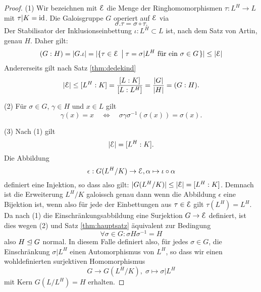 \documentclass{book}
\begin{document}
\begin{proof}
    (1) Wir bezeichnen mit $\EuScript{E}$ die Menge der Ringhomomorphismen $\tau: L^H \to L$
    mit $\tau|K = \operatorname{id}$. Die Galoisgruppe $G$ operiert auf $\EuScript{E}$ via
    \[
        \sigma.\tau = \sigma \circ \tau.
    \]
    Der Stabilisator der Inklusionseinbettung $\iota: L^H \subset L$ ist, nach dem
    Satz von Artin, genau $H$. Daher gilt:
    \[
        (G:H) = |G.\iota| = |\{\tau \in \EuScript{E}\; \left| \; \text{$\tau = \sigma|L^H$ für ein $\sigma \in G$} \right. \}| \le |\EuScript{E}|
    \]
    Andererseits gilt nach Satz \ref{thm:dedekind} 
    \[
        |\EuScript{E}| \le [L^H:K] = \frac{[L:K]}{[L:L^H]} = \frac{|G|}{|H|} = (G:H).
    \]

    \noindent
    (2) Für $\sigma \in G$, $\gamma \in H$ und $x \in L$ gilt
    \[
        \gamma(x) = x \quad \iff \quad \sigma\gamma\sigma^{-1}(\sigma(x)) = \sigma(x).
    \]

    \noindent
    (3) Nach (1) gilt
    \[
        |\EuScript{E}| = [L^H:K].
    \]
    Die Abbildung
    \[
        \epsilon:  G(L^H/K) \to \EuScript{E}, \alpha \mapsto \iota \circ \alpha
    \]
    definiert eine Injektion, so dass also gilt: $|G(L^H/K)| \le |\EuScript{E}| = [L^H:K]$. Demnach ist die Erweiterung $L^H/K$
    galoissch genau dann wenn die Abbildung $\epsilon$ eine Bijektion
    ist, wenn also für jede der Einbettungen aus $\tau \in \EuScript{E}$ gilt $\tau(L^H)
    = L^H$. Da nach (1) die Einschränkungsabbildung eine Surjektion $G \to \EuScript{E}$
    definiert, ist dies wegen (2) und Satz \ref{thm:hauptsatz} äquivalent zur Bedingung
    \[
        \forall \sigma \in G: \sigma H \sigma^{-1} = H
    \]
    also $H \trianglelefteq G$ normal. In diesem Falle definiert also, für jedes $\sigma \in
    G$, die Einschränkung $\sigma|L^H$ einen Automorphismus von $L^H$, so dass
    wir einen wohldefinierten surjektiven Homomorphismus 
    \[
        G \to G(L^H/K), \; \sigma \mapsto \sigma|L^H
    \]
    mit Kern $G(L/L^H) = H$ erhalten.
\end{proof}
\end{document}
